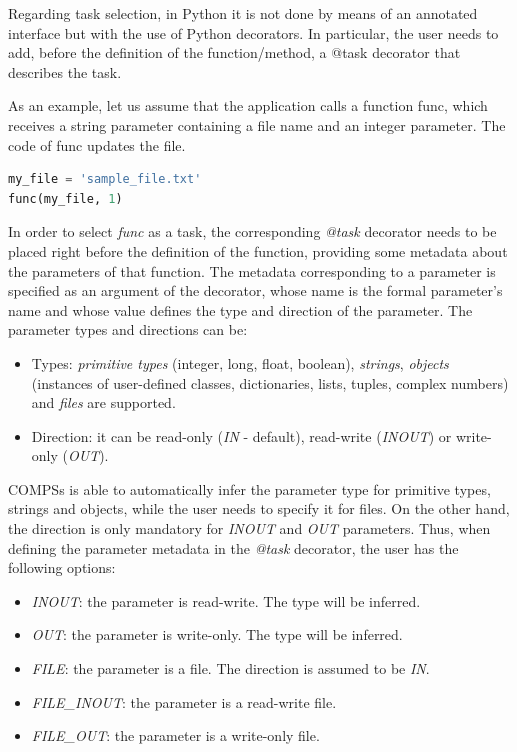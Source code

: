 Regarding task selection, in Python it is not done by means of an annotated interface but with the use of Python decorators. In particular, the user needs to add, before the definition of the function/method, a @task decorator that describes the task.

As an example, let us assume that the application calls a function func, which receives a string parameter containing a file name and an integer parameter. The code of func updates the file.

\begin{lstlisting}[language=python]
my_file = 'sample_file.txt'
func(my_file, 1)
\end{lstlisting}

In order to select {\it func} as a task, the corresponding {\it @task} decorator needs to be placed right before the definition of the function, providing some metadata about the parameters of that function. The metadata corresponding to a parameter is specified as an argument of the decorator, whose name is the formal parameter’s name and whose value defines the type and direction of the parameter. The parameter types and directions can be:

\begin{itemize}
 \item Types: {\it primitive types} (integer, long, float, boolean), {\it strings}, {\it objects} (instances of user-defined classes, dictionaries, lists, tuples, complex numbers) and {\it files} are supported.
 \item Direction: it can be read-only ({\it IN} - default), read-write ({\it INOUT}) or write-only ({\it OUT}).
\end{itemize}

COMPSs is able to automatically infer the parameter type for primitive types, strings and objects, while the user needs to specify it for files. On the other hand, the direction is only mandatory for {\it INOUT} and {\it OUT} parameters. Thus, when defining the parameter metadata in the {\it @task} decorator, the user has the following options:

\begin{itemize}
 \item {\it INOUT}: the parameter is read-write. The type will be inferred.
 \item {\it OUT}: the parameter is write-only. The type will be inferred.
 \item {\it FILE}: the parameter is a file. The direction is assumed to be {\it IN}.
 \item {\it FILE\_INOUT}: the parameter is a read-write file.
 \item {\it FILE\_OUT}: the parameter is a write-only file.
\end{itemize}
     
